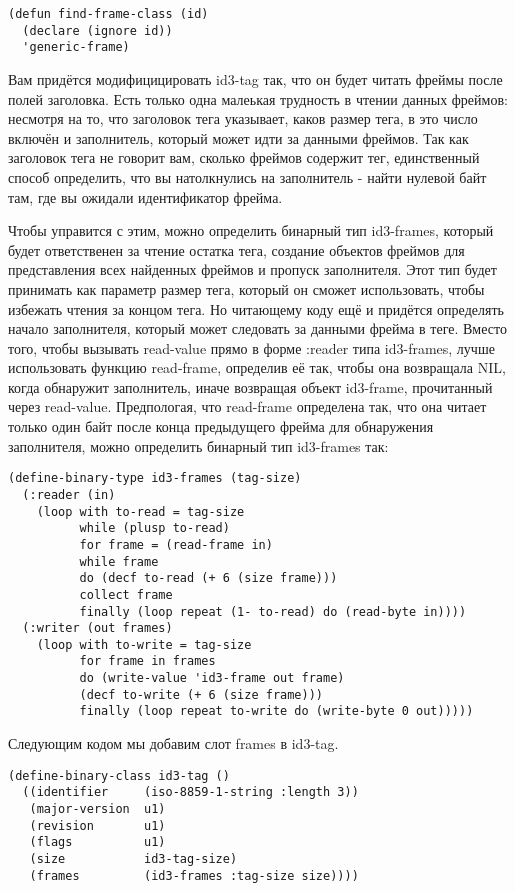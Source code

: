 \begin{lstlisting}
(defun find-frame-class (id)
  (declare (ignore id))
  'generic-frame)
\end{lstlisting}

Вам придётся модифицицировать id3-tag так, что он будет читать фреймы после полей
заголовка. Есть только одна малеькая трудность в чтении данных фреймов: несмотря на то,
что заголовок тега указывает, каков размер тега, в это число включён и заполнитель,
который может идти за данными фреймов. Так как заголовок тега не говорит вам, сколько
фреймов содержит тег, единственный способ определить, что вы натолкнулись на заполнитель -
найти нулевой байт там, где вы ожидали идентификатор фрейма.

Чтобы управится с этим, можно определить бинарный тип id3-frames, который будет
ответственен за чтение остатка тега, создание объектов фреймов для представления всех
найденных фреймов и пропуск заполнителя. Этот тип будет принимать как параметр размер
тега, который он сможет использовать, чтобы избежать чтения за концом тега. Но читающему
коду ещё и придётся определять начало заполнителя, который может следовать за данными
фрейма в теге. Вместо того, чтобы вызывать read-value прямо в форме :reader типа
id3-frames, лучше использовать функцию read-frame, определив её так, чтобы она возвращала
NIL, когда обнаружит заполнитель, иначе возвращая объект id3-frame, прочитанный через
read-value. Предпологая, что read-frame определена так, что она читает только один байт
после конца предыдущего фрейма для обнаружения заполнителя, можно определить бинарный тип
id3-frames так:

\begin{lstlisting}
(define-binary-type id3-frames (tag-size)
  (:reader (in)
    (loop with to-read = tag-size
          while (plusp to-read)
          for frame = (read-frame in)
          while frame
          do (decf to-read (+ 6 (size frame)))
          collect frame
          finally (loop repeat (1- to-read) do (read-byte in))))
  (:writer (out frames)
    (loop with to-write = tag-size
          for frame in frames
          do (write-value 'id3-frame out frame)
          (decf to-write (+ 6 (size frame)))
          finally (loop repeat to-write do (write-byte 0 out)))))
\end{lstlisting}

Следующим кодом мы добавим слот frames в id3-tag.

\begin{lstlisting}
(define-binary-class id3-tag ()
  ((identifier     (iso-8859-1-string :length 3))
   (major-version  u1)
   (revision       u1)
   (flags          u1)
   (size           id3-tag-size)
   (frames         (id3-frames :tag-size size))))
\end{lstlisting}

